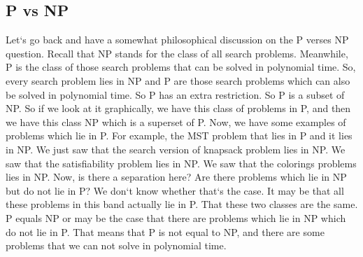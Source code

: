 \subsection{P vs NP}
Let`s go back and have a somewhat philosophical discussion on the P verses NP question.
Recall that NP stands for the class of all search problems.
Meanwhile, P is the class of those search problems that can be solved in polynomial time.
So, every search problem lies in NP and P are those search problems which can also be solved in polynomial time.
So P has an extra restriction.
So P is a subset of NP\@.
So if we look at it graphically, we have this class of problems in P, and then we have this class NP which is a superset of P\@.
Now, we have some examples of problems which lie in P\@.
For example, the MST problem that lies in P and it lies in NP\@.
We just saw that the search version of knapsack problem lies in NP\@.
We saw that the satisfiability problem lies in NP\@.
We saw that the colorings problems lies in NP\@.
Now, is there a separation here? Are there problems which lie in NP but do not lie in P? We don`t know whether that`s the case.
It may be that all these problems in this band actually lie in P\@.
That these two classes are the same.
P equals NP or may be the case that there are problems which lie in NP which do not lie in P\@.
That means that P is not equal to NP, and there are some problems that we can not solve in polynomial time.

